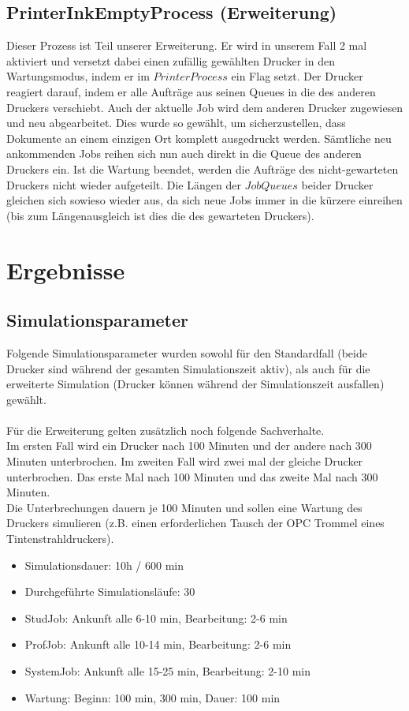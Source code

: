 \documentclass[12pt,a4paper]{article}
\begin{document}
	\subsection{PrinterInkEmptyProcess (Erweiterung)}
	Dieser Prozess ist Teil unserer Erweiterung. Er wird in unserem Fall 2 mal aktiviert und versetzt dabei einen zufällig gewählten Drucker in den Wartungsmodus, indem er im $PrinterProcess$ ein Flag setzt. 
	Der Drucker reagiert darauf, indem er alle Aufträge aus seinen Queues in die des anderen Druckers verschiebt. Auch der aktuelle Job wird dem anderen Drucker zugewiesen und neu abgearbeitet. Dies wurde 
	so gewählt, um sicherzustellen, dass Dokumente an einem einzigen Ort komplett ausgedruckt werden. Sämtliche neu ankommenden Jobs reihen sich nun auch direkt in die Queue des anderen Druckers
	ein. Ist die Wartung beendet, werden die Aufträge des nicht-gewarteten Druckers nicht wieder aufgeteilt. Die Längen der $JobQueues$ beider Drucker gleichen sich sowieso wieder aus, da sich neue Jobs
	immer in die kürzere einreihen (bis zum Längenausgleich ist dies die des gewarteten Druckers).
	
	\section{Ergebnisse}
	\subsection{Simulationsparameter}
	Folgende Simulationsparameter wurden sowohl für den Standardfall (beide Drucker sind während der gesamten Simulationszeit aktiv), als auch für die erweiterte Simulation (Drucker können während der
	Simulationszeit ausfallen) gewählt.\\
	\\
	Für die Erweiterung gelten zusätzlich noch folgende Sachverhalte.\\
	Im ersten Fall wird ein Drucker nach 100 Minuten und der andere nach 300 Minuten unterbrochen.
	Im zweiten Fall wird zwei mal der gleiche Drucker unterbrochen. Das erste Mal nach 100 Minuten und das zweite Mal nach 300 Minuten.\\
	Die Unterbrechungen dauern je 100 Minuten und sollen eine Wartung des Druckers simulieren (z.B. einen erforderlichen Tausch der OPC Trommel eines Tintenstrahldruckers).
	\\
	\begin{itemize}
		\item Simulationsdauer: 10h / 600 min
		\item Durchgeführte Simulationsläufe: 30
		\item StudJob: Ankunft alle 6-10 min, Bearbeitung: 2-6 min
		\item ProfJob: Ankunft alle 10-14 min, Bearbeitung: 2-6 min
		\item SystemJob: Ankunft alle 15-25 min, Bearbeitung: 2-10 min
		\item Wartung: Beginn: 100 min, 300 min, Dauer: 100 min
	\end{itemize}	
		
\end{document}
